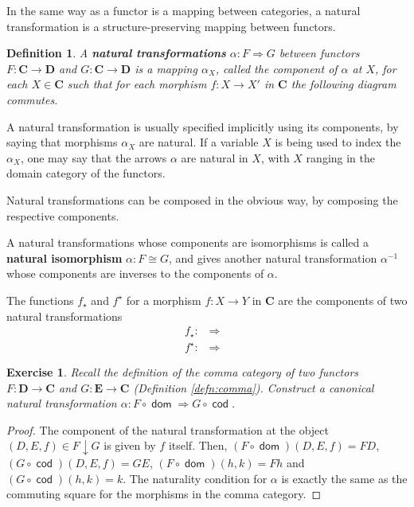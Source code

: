 \documentclass[a5paper,oneside,11pt]{article}
\newtheorem{ex}{Exercise}
\newtheorem{defn}{Definition}
\newcommand\1{\mathord{\mathrm{1}}}
\newcommand\cat[1]{\mathbf{#1}}
\newcommand\Hom[3]{\mathop{\mathsf{Hom}_{\cat{#1}}(#2, #3)}}
\newcommand\dom{\mathop{\mathsf{dom}}}
\newcommand\cod{\mathop{\mathsf{cod}}}
\begin{document}
In the same way as a functor is a mapping between categories, a natural transformation
is a structure-preserving mapping between functors.
\begin{defn}
    \label{defn:natural}
    A \textbf{natural transformations} $\alpha : F \Longrightarrow G$
    between functors $F : \cat{C} \longrightarrow \cat{D}$
    and $G : \cat{C} \longrightarrow \cat{D}$ is a mapping $\alpha_X$, called
    the component of $\alpha$ at $X$, for each $X \in \cat{C}$ such that for each
    morphism $f : X \rightarrow X'$ in $\cat{C}$ the
    following diagram commutes.
    \begin{figure}[H]
        \centering
    \end{figure}
\end{defn}
A natural transformation is usually specified implicitly using its components, by
saying that morphisms $\alpha_X$ are natural. If a variable $X$ is being used
to index the $\alpha_X$, one may say that the arrows $\alpha$ are natural in $X$,
with $X$ ranging in the domain category of the functors.

Natural transformations can be composed in the obvious way, by composing the
respective components.

A natural transformations whose components are isomorphisms is called a
\textbf{natural isomorphism} $\alpha : F \cong G$, and gives another natural
transformation $\alpha^{-1}$ whose components are inverses to the components of $\alpha$.

The functions $f_\star$ and $f^\star$ for a
morphism $f : X \rightarrow Y$ in $\cat{C}$ are the components of two natural transformations
\begin{eqnarray*}
    f_\star : \Hom{C}{-}{X} \Longrightarrow \Hom{C}{-}{Y} \\
    f^\star : \Hom{C}{Y}{-} \Longrightarrow \Hom{C}{X}{-}
\end{eqnarray*}

\begin{ex}
    Recall the definition of the comma category of two functors
    $F : \cat{D} \longrightarrow \cat{C}$ and $G : \cat{E} \longrightarrow \cat{C}$
    (Definition \ref{defn:comma}). Construct a canonical natural transformation
    $\alpha : F \circ \dom \Longrightarrow G \circ \cod$.
\end{ex}
\begin{proof}
    The component of the natural transformation at the object
    $(D, E, f) \in F \downarrow G$ is given by $f$ itself.
    Then, $(F \circ \dom)(D, E, f) = FD$, $(G \circ \cod)(D, E, f) = GE$,
    $(F \circ \dom)(h, k) = Fh$ and $(G \circ \cod)(h, k) = k$.
    The naturality condition for $\alpha$ is exactly the same as the commuting square
    for the morphisms in the comma category.
\end{proof}
\end{document}

